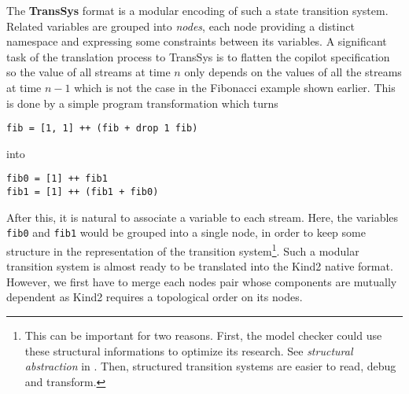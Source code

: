 \medskip

The \textbf{TransSys} format is a modular encoding of such a state transition system. Related variables are grouped into \textit{nodes}, each node providing a distinct namespace and expressing some constraints between its variables. A significant task of the translation process to TransSys is to flatten the copilot specification so the value of all streams at time $n$ only depends on the values of all the streams at time $n - 1$ which is not the case in the Fibonacci example shown earlier. This is done by a simple program transformation which turns
\begin{lstlisting}
fib = [1, 1] ++ (fib + drop 1 fib)
\end{lstlisting}
into
\begin{lstlisting}
fib0 = [1] ++ fib1
fib1 = [1] ++ (fib1 + fib0)
\end{lstlisting}

After this, it is natural to associate a variable to each stream. Here, the variables \texttt{fib0} and \texttt{fib1} would be grouped into a single node, in order to keep some structure in the representation of the transition system\footnote{This can be important for two reasons. First, the model checker could use these structural informations to optimize its research. See \emph{structural abstraction} in \cite{HagenPhD}. Then, structured transition systems are easier to read, debug and transform. }. Such a modular transition system is almost ready to be translated into the Kind2 native format. However, we first have to merge each nodes pair whose components are mutually dependent as Kind2 requires a topological order on its nodes.




